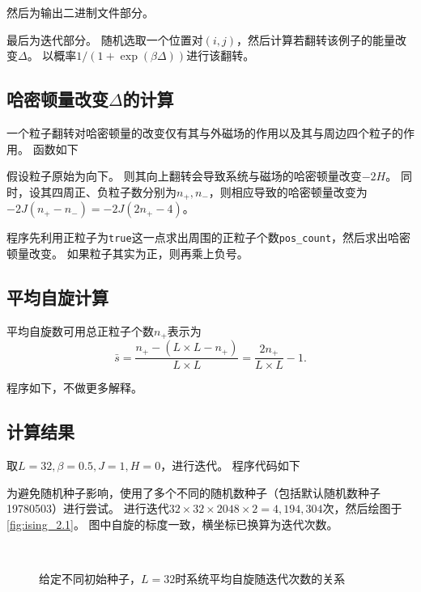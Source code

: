 \documentclass[a4paper,unicode]{report}
\begin{document}
然后为输出二进制文件部分。

最后为迭代部分。
随机选取一个位置对$(i, j)$，然后计算若翻转该例子的能量改变$\Delta$。
以概率$1/(1+\exp(\beta\Delta))$进行该翻转。

\subsection{哈密顿量改变\texorpdfstring{$\Delta$}{Δ}的计算}
一个粒子翻转对哈密顿量的改变仅有其与外磁场的作用以及其与周边四个粒子的作用。
函数如下
{
    \linespread{1.0}
    
}

假设粒子原始为向下。
则其向上翻转会导致系统与磁场的哈密顿量改变$-2H$。
同时，设其四周正、负粒子数分别为$n_+, n_-$，则相应导致的哈密顿量改变为$-2J(n_+ - n_-) = -2J(2n_+ - 4)$。

程序先利用正粒子为\verb|true|这一点求出周围的正粒子个数\verb|pos_count|，然后求出哈密顿量改变。
如果粒子其实为正，则再乘上负号。

\subsection{平均自旋计算}
平均自旋数可用总正粒子个数$n_+$表示为
\begin{equation}
    \bar{s} = \frac{n_+ - (L\times L - n_+)}{L\times L} = \frac{2n_+}{L\times L} - 1.
\end{equation}

程序如下，不做更多解释。
{
    \linespread{1.0}
    
}

\subsection{计算结果}
取$L = 32,\beta = 0.5, J=1, H = 0$，进行迭代。
程序代码如下
{
    \linespread{1.0}
    
}

为避免随机种子影响，使用了多个不同的随机数种子（包括默认随机数种子19780503）进行尝试。
进行迭代$32\times 32\times 2048\times 2 = 4,194,304$次，然后绘图于\autoref{fig:ising_2.1}。
图中自旋的标度一致，横坐标已换算为迭代次数。

\begin{figure}
    \centering
    \\
    \caption{给定不同初始种子，$L=32$时系统平均自旋随迭代次数的关系}
    \label{fig:ising_2.1}
\end{figure}
\end{document}
